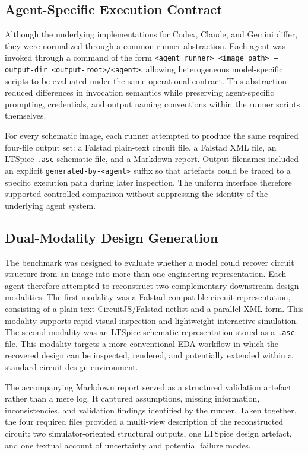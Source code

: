 \subsection{Agent-Specific Execution Contract}

Although the underlying implementations for Codex, Claude, and Gemini differ, they were normalized through a common runner abstraction. Each agent was invoked through a command of the form \texttt{<agent runner> <image path> --output-dir <output-root>/<agent>}, allowing heterogeneous model-specific scripts to be evaluated under the same operational contract. This abstraction reduced differences in invocation semantics while preserving agent-specific prompting, credentials, and output naming conventions within the runner scripts themselves.

For every schematic image, each runner attempted to produce the same required four-file output set: a Falstad plain-text circuit file, a Falstad XML file, an LTSpice \texttt{.asc} schematic file, and a Markdown report. Output filenames included an explicit \texttt{generated-by-<agent>} suffix so that artefacts could be traced to a specific execution path during later inspection. The uniform interface therefore supported controlled comparison without suppressing the identity of the underlying agent system.

\subsection{Dual-Modality Design Generation}

The benchmark was designed to evaluate whether a model could recover circuit structure from an image into more than one engineering representation. Each agent therefore attempted to reconstruct two complementary downstream design modalities. The first modality was a Falstad-compatible circuit representation, consisting of a plain-text CircuitJS/Falstad netlist and a parallel XML form. This modality supports rapid visual inspection and lightweight interactive simulation. The second modality was an LTSpice schematic representation stored as a \texttt{.asc} file. This modality targets a more conventional EDA workflow in which the recovered design can be inspected, rendered, and potentially extended within a standard circuit design environment.

The accompanying Markdown report served as a structured validation artefact rather than a mere log. It captured assumptions, missing information, inconsistencies, and validation findings identified by the runner. Taken together, the four required files provided a multi-view description of the reconstructed circuit: two simulator-oriented structural outputs, one LTSpice design artefact, and one textual account of uncertainty and potential failure modes.

